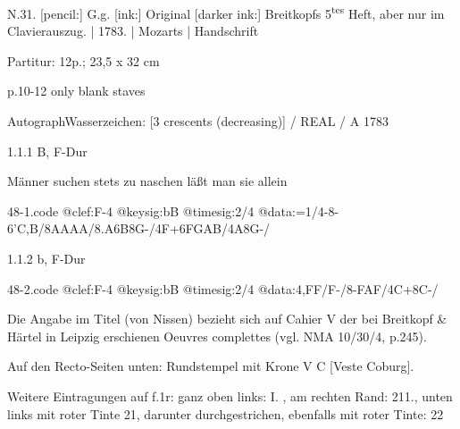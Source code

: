 \documentclass[a4paper, twocolumn, 11pt]{book}
\begin{document}
\par \begin{itshape} N.31. [pencil:] G.g. [ink:] Original [darker ink:] Breitkopfs 5\textsuperscript{t}\textsuperscript{e}\textsuperscript{s} Heft, aber nur im Clavierauszug. | 1783. | Mozarts | Handschrift\end{itshape} 
\par \textcolor{darkblue}{}  Partitur: 12p.; 23,5 x 32 cm\newline \begin{small} p.10-12 only blank staves\end{small} \newline Autograph\newline Wasserzeichen: [3 crescents (decreasing)] / REAL / A  1783
\par 1.1.1  B, F-Dur\newline \begin{footnotesize} Männer suchen stets zu naschen läßt man sie allein \end{footnotesize}  
\begin{filecontents*}{48-1.code}
@clef:F-4
@keysig:bB
@timesig:2/4
@data:=1/4-8-6'C,B/8AAAA/{8.A6B}8G-/4F+6FGAB/4A8G-/
\end{filecontents*}
\newline %
\par 1.1.2  b, F-Dur  
\begin{filecontents*}{48-2.code}
@clef:F-4
@keysig:bB
@timesig:2/4
@data:4,FF/F-/8-{FAF}/4C+8C-/
\end{filecontents*}
\newline %
\par Die Angabe im Titel (von Nissen) bezieht sich auf Cahier V der bei Breitkopf \& Härtel in Leipzig erschienen {\textquotedbl}Oeuvres complettes{\textquotedbl} (vgl. NMA 10/30/4, p.245).
\par Auf den Recto-Seiten unten: Rundstempel mit Krone {\textquotedbl}V C{\textquotedbl} [Veste Coburg].
\par Weitere Eintragungen auf f.1r: ganz oben links: {\textquotedbl}I.{\textquotedbl} , am rechten Rand: {\textquotedbl}211.{\textquotedbl}, unten links mit roter Tinte {\textquotedbl}21{\textquotedbl}, darunter durchgestrichen, ebenfalls mit roter Tinte: {\textquotedbl}22{\textquotedbl}
\end{document}
